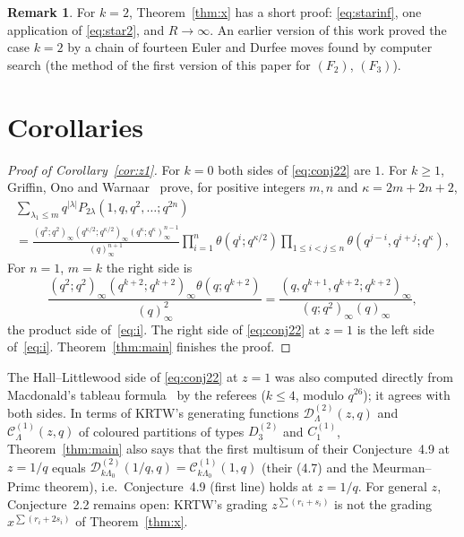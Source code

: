 \documentclass[11pt]{amsart}
\theoremstyle{definition}
\newtheorem{remark}[theorem]{Remark}
\numberwithin{equation}{section}
\begin{document}
\begin{remark}\label{rem:k2}
For $k=2$, Theorem~\ref{thm:x} has a short proof: \eqref{eq:starinf}, one application of
\eqref{eq:star2}, and $R\to\infty$. An earlier version of this work proved the case $k=2$ by a chain of
fourteen Euler and Durfee moves found by computer search (the method of the first version of
this paper for $(F_2)$, $(F_3)$).
\end{remark}

\section{Corollaries}\label{sec:cor}

\begin{proof}[Proof of Corollary~\ref{cor:z1}]
For $k=0$ both sides of \eqref{eq:conj22} are $1$. For $k\ge1$, Griffin, Ono and
Warnaar~\cite[Theorem~1.2, eq.~(1.9)]{GOW} prove, for positive integers $m,n$ and $\kappa=2m+2n+2$,
\begin{multline*}
\sum_{\lambda_1\le m}q^{|\lambda|}P_{2\lambda}(1,q,q^2,\dots;q^{2n})\\=
\frac{(q^2;q^2)_\infty(q^{\kappa/2};q^{\kappa/2})_\infty(q^\kappa;q^\kappa)_\infty^{n-1}}{(q)_\infty^{n+1}}
\prod_{i=1}^n\theta(q^i;q^{\kappa/2})\prod_{1\le i<j\le n}\theta(q^{j-i},q^{i+j};q^\kappa),
\end{multline*}
For $n=1$, $m=k$ the right side is
\[\frac{(q^2;q^2)_\infty(q^{k+2};q^{k+2})_\infty\theta(q;q^{k+2})}{(q)_\infty^2}=\frac{(q,q^{k+1},q^{k+2};q^{k+2})_\infty}{(q;q^2)_\infty(q)_\infty},\]
the product side of~\eqref{eq:i}. The right side of \eqref{eq:conj22} at $z=1$ is the left side
of~\eqref{eq:i}. Theorem~\ref{thm:main} finishes the proof.
\end{proof}

The Hall--Littlewood side of \eqref{eq:conj22} at $z=1$ was also computed directly from Macdonald's
tableau formula~\cite[III.(5.11$'$)]{Macdonald} by the referees ($k\le4$, modulo $q^{26}$); it agrees with both sides. In terms of KRTW's generating functions
$\mathcal D^{(2)}_{\Lambda}(z,q)$ and $\mathcal C^{(1)}_{\Lambda}(z,q)$ of coloured partitions of types
$D^{(2)}_3$ and $C^{(1)}_1$, Theorem~\ref{thm:main} also says that the first multisum of their
Conjecture~4.9 at $z=1/q$ equals $\mathcal D^{(2)}_{k\Lambda_0}(1/q,q)=\mathcal C^{(1)}_{k\Lambda_0}(1,q)$ (their (4.7) and the
Meurman--Primc theorem), i.e.\ Conjecture~4.9 (first line) holds at $z=1/q$. For general $z$,
Conjecture~2.2 remains open: KRTW's grading $z^{\sum(r_i+s_i)}$ is not the grading
$x^{\sum(r_i+2s_i)}$ of Theorem~\ref{thm:x}.
\end{document}
